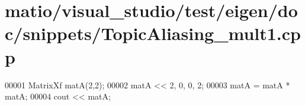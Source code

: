 \hypertarget{matio_2visual__studio_2test_2eigen_2doc_2snippets_2_topic_aliasing__mult1_8cpp_source}{}\section{matio/visual\+\_\+studio/test/eigen/doc/snippets/\+Topic\+Aliasing\+\_\+mult1.cpp}
\label{matio_2visual__studio_2test_2eigen_2doc_2snippets_2_topic_aliasing__mult1_8cpp_source}

\begin{DoxyCode}
00001 MatrixXf matA(2,2); 
00002 matA << 2, 0,  0, 2;
00003 matA = matA * matA;
00004 cout << matA;
\end{DoxyCode}
